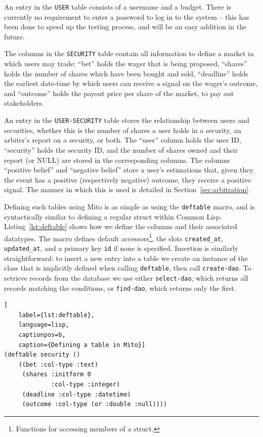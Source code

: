 \documentclass[10pt,a4paper]{article}
\theoremstyle{plain}
\theoremstyle{definition}
\newcommand{\code}[1]{\texttt{#1}}
\begin{document}
An entry in the \code{USER} table consists of a username and a budget. There is
currently no requirement to enter a password to log in to the system -- this
has been done to speed up the testing process, and will be an easy addition in
the future.

The columns in the \code{SECURITY} table contain all information to define a
market in which users may trade: ``bet'' holds the wager that is being
proposed, ``shares'' holds the number of shares which have been bought and
sold, ``deadline'' holds the earliest date-time by which users can receive a
signal on the wager's outcome, and ``outcome'' holds the payout price per share
of the market, to pay out stakeholders.

An entry in the \code{USER-SECURITY} table stores the relationship between
users and securities, whether this is the number of shares a user holds in a
security, an arbiter's report on a security, or both. The ``user'' column
holds the user ID, ``security'' holds the security ID, and the number of shares
owned and their report (or NULL) are stored in the corresponding columns. The
columns ``positive belief'' and ``negative belief'' store a user's estimations
that, given they the event has a positive (respectively negative) outcome, they
receive a positive signal. The manner in which this is used is detailed in
Section~\ref{sec:arbitration}.

Defining such tables using Mito is as simple as using the \code{deftable}
macro, and is syntactically similar to defining a regular struct within Common
Lisp. Listing~\ref{lst:deftable} shows how we define the columns and their
associated datatypes. The macro defines default accessors\footnote{Functions
for accessing members of a struct.}, the slots \code{created\_at},
\code{updated\_at}, and a primary key \code{id} if none is specified. Insertion
is similarly straightforward: to insert a new entry into a table we create an
instance of the class that is implicitly defined when calling \code{deftable},
then call \code{create-dao}. To retrieve records from the database we use
either \code{select-dao}, which returns all records matching the conditions, or
\code{find-dao}, which returns only the first.

\begin{lstlisting}[
	label={lst:deftable},
	language=lisp,
	captionpos=b,
	caption={Defining a table in Mito}]
(deftable security ()
    ((bet :col-type :text)
     (shares :initform 0
             :col-type :integer)
     (deadline :col-type :datetime)
     (outcome :col-type (or :double :null))))
\end{lstlisting}
\end{document}
